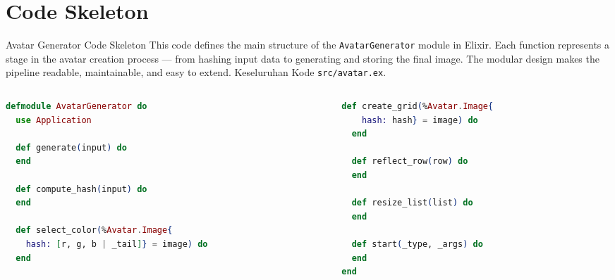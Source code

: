\documentclass[aspectratio=169, table]{beamer}
\begin{document}
\section{Code Skeleton}
\begin{frame}[fragile]{Avatar Generator Code Skeleton}
\vspace{20pt}
\small
This code defines the main structure of the \texttt{AvatarGenerator} module in Elixir.  
Each function represents a stage in the avatar creation process — from hashing input data to generating and storing the final image.  
The modular design makes the pipeline readable, maintainable, and easy to extend. Keseluruhan Kode \texttt{src/avatar.ex}.

\begin{columns}[T,totalwidth=\textwidth]
  \begin{column}{0.48\textwidth}
    \begin{lstlisting}[language=Elixir, basicstyle=\ttfamily\scriptsize, firstnumber=1]
defmodule AvatarGenerator do
  use Application

  def generate(input) do
  end

  def compute_hash(input) do
  end

  def select_color(%Avatar.Image{
    hash: [r, g, b | _tail]} = image) do
  end
    \end{lstlisting}
  \end{column}

  \begin{column}{0.48\textwidth}
    \begin{lstlisting}[language=Elixir, basicstyle=\ttfamily\scriptsize, firstnumber=13]
  def create_grid(%Avatar.Image{
    hash: hash} = image) do
  end

  def reflect_row(row) do
  end

  def resize_list(list) do
  end

  def start(_type, _args) do
  end
end
    \end{lstlisting}
  \end{column}
\end{columns}
\end{frame}
\end{document}
